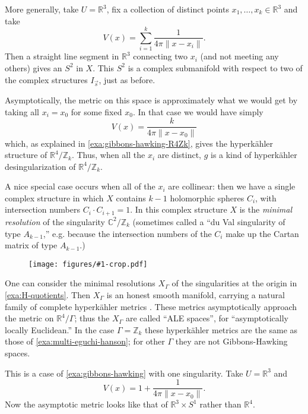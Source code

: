 \documentclass[12pt,letterpaper,reqno]{article}
\numberwithin{equation}{section}
\newcommand{\R}{\ensuremath{\mathbb R}}
\newcommand{\C}{\ensuremath{\mathbb C}}
\newcommand{\Z}{\ensuremath{\mathbb Z}}
\newcommand{\hk}{hyperk\"ahler\xspace}
\newcommand{\norm}[1]{\lVert#1\rVert}
\newcommand{\ti}[1]{\textit{#1}}
\newcommand{\insfig}[2]{\begin{figure}[htbp] \centering \texttt{[image: figures/\#1-crop.pdf]} \label{fig:#1} \end{figure}}
\begin{document}
\begin{example} \cite{MR520463} \label{exa:multi-eguchi-hanson} More generally, take $U = \R^3$, fix a collection
of distinct points $x_1, \dots, x_k \in \R^3$ and take
\begin{equation}
  V(x) = \sum_{i=1}^k \frac{1}{4 \pi \norm{x - x_i}}.
\end{equation}
Then a straight line segment in $\R^3$ connecting two $x_i$ (and not meeting any others)
gives an $S^2$ in $X$. This $S^2$ is a complex submanifold with respect to two of the complex structures $I_{\vec s}$, just as before.

Asymptotically, the metric on this space is approximately
what we would get by taking all $x_i = x_0$ for some fixed $x_0$. 
In that case we would have simply 
\begin{equation}
 V(x) = \frac{k}{4 \pi \norm{x - x_0}}
\end{equation}
which, as explained in \autoref{exa:gibbons-hawking-R4Zk},
gives the \hk structure of $\R^4 / \Z_k$.
Thus, when all the $x_i$ are distinct,
$g$ is a kind of \hk desingularization of $\R^4 / \Z_k$.

A nice special case occurs when all of the $x_i$ are collinear:
then we have a single complex structure in which $X$ contains $k-1$
holomorphic spheres $C_i$, with intersection numbers
$C_i \cdot C_{i+1} = 1$. In this complex structure $X$ is 
the \ti{minimal resolution} of the singularity $\C^2 / \Z_k$
(sometimes called a ``du Val singularity of type $A_{k-1}$,'' e.g.
because the intersection numbers of the $C_i$ make up the
Cartan matrix of type $A_{k-1}$.)
\end{example}

\insfig{higgs-bundles-5}{0.9}

\begin{example} \label{exa:ALE-spaces}
One can consider the minimal resolutions $X_\Gamma$
of the singularities at the origin in \autoref{exa:H-quotients}.
Then $X_\Gamma$ is an honest smooth manifold, 
carrying a natural family 
of complete \hk metrics \cite{MR90d:53055}.
These metrics asymptotically approach
the metric on $\R^4 / \Gamma$;
thus the $X_\Gamma$ are called ``ALE spaces'',
for ``asymptotically locally Euclidean.''
In the case $\Gamma = \Z_k$ these \hk metrics are
the same as those of \autoref{exa:multi-eguchi-hanson};
for other $\Gamma$ they are not Gibbons-Hawking spaces.
\end{example}

\begin{example}
This is a case of \autoref{exa:gibbons-hawking}
with one singularity. 
Take $U = \R^3$ and
\begin{equation}
  V(x) = 1 + \frac{1}{4\pi \norm{x-x_0}}.
\end{equation}
Now the asymptotic metric looks like that of $\R^3 \times S^1$
rather than $\R^4$.
\end{example}
\end{document}
